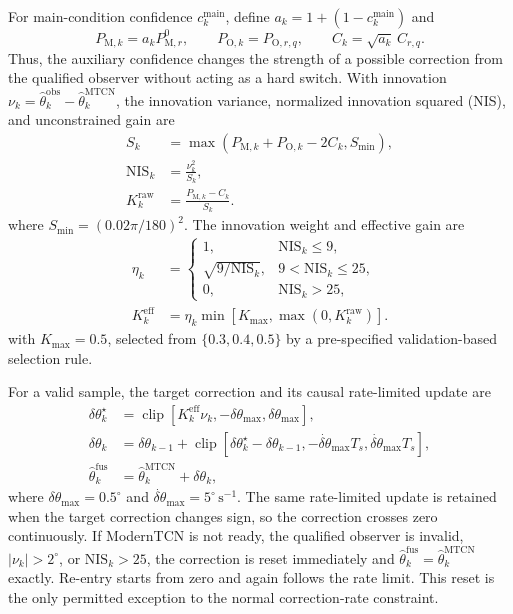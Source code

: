 \documentclass{ieeeaccess}
\begin{document}
For main-condition confidence $c_k^{\mathrm{main}}$, define $a_k=1+(1-c_k^{\mathrm{main}})$ and
\begin{equation}
P_{\mathrm{M},k}=a_kP_{\mathrm{M},r}^{0},\qquad
P_{\mathrm{O},k}=P_{\mathrm{O},r,q},\qquad
C_k=\sqrt{a_k}\,C_{r,q}.
\label{eq:moderntcn_regime_uncertainty}
\end{equation}
Thus, the auxiliary confidence changes the strength of a possible correction from the qualified observer without acting as a hard switch. With innovation $\nu_k=\hat\theta_k^{\mathrm{obs}}-\hat\theta_k^{\mathrm{MTCN}}$, the innovation variance, normalized innovation squared (NIS), and unconstrained gain are
\begin{equation}
\begin{aligned}
S_k&=\max(P_{\mathrm{M},k}+P_{\mathrm{O},k}-2C_k,S_{\min}),\\
\mathrm{NIS}_k&=\frac{\nu_k^2}{S_k},\\
K_k^{\mathrm{raw}}&=\frac{P_{\mathrm{M},k}-C_k}{S_k}.
\end{aligned}
\label{eq:adaptive_imu_gain}
\end{equation}
where $S_{\min}=(0.02\pi/180)^2$. The innovation weight and effective gain are
\begin{equation}
\begin{aligned}
\eta_k&=
\begin{cases}
1, & \mathrm{NIS}_k\leq9,\\
\sqrt{9/\mathrm{NIS}_k}, &9<\mathrm{NIS}_k\leq25,\\
0, & \mathrm{NIS}_k>25,
\end{cases}\\
K_k^{\mathrm{eff}}&=\eta_k\min[K_{\max},\max(0,K_k^{\mathrm{raw}})].
\end{aligned}
\label{eq:innovation_conditioned_imu_gain}
\end{equation}
with $K_{\max}=0.5$, selected from $\{0.3,0.4,0.5\}$ by a pre-specified validation-based selection rule.

For a valid sample, the target correction and its causal rate-limited update are
\begin{align}
\delta\theta_k^{\star}
&=\operatorname{clip}\!\left[
K_k^{\mathrm{eff}}\nu_k,
-\delta\theta_{\max},\delta\theta_{\max}
\right],\nonumber\\
\delta\theta_k
&=\delta\theta_{k-1}
+\operatorname{clip}\!\left[
\delta\theta_k^{\star}-\delta\theta_{k-1},
-\dot{\delta\theta}_{\max}T_s,
\dot{\delta\theta}_{\max}T_s
\right],\nonumber\\
\hat\theta_k^{\mathrm{fus}}
&=\hat\theta_k^{\mathrm{MTCN}}+\delta\theta_k,
\label{eq:adaptive_slope_fusion}
\end{align}
where $\delta\theta_{\max}=0.5^{\circ}$ and $\dot{\delta\theta}_{\max}=5^{\circ}\,\mathrm{s}^{-1}$. The same rate-limited update is retained when the target correction changes sign, so the correction crosses zero continuously. If ModernTCN is not ready, the qualified observer is invalid, $|\nu_k|>2^{\circ}$, or $\mathrm{NIS}_k>25$, the correction is reset immediately and $\hat\theta_k^{\mathrm{fus}}=\hat\theta_k^{\mathrm{MTCN}}$ exactly. Re-entry starts from zero and again follows the rate limit. This reset is the only permitted exception to the normal correction-rate constraint.
\end{document}
